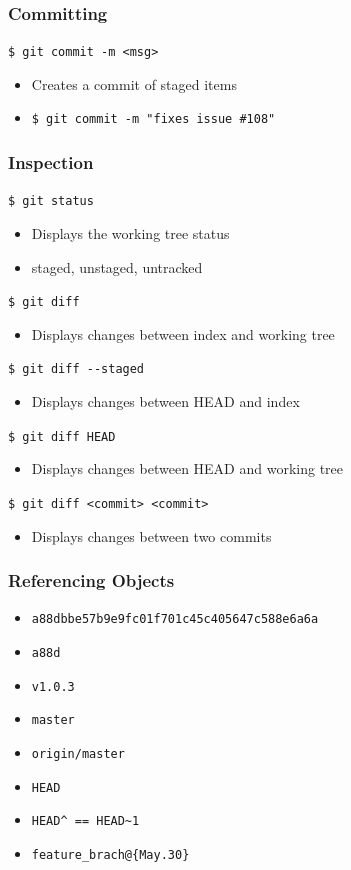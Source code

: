 \documentclass[english,compress]{beamer}
\begin{document}
\begin{frame}[fragile]
    \frametitle{Committing}

    \verb|$ git commit -m <msg>|
    \begin{itemize}
        \item Creates a commit of staged items
        \item \verb|$ git commit -m "fixes issue #108"|
    \end{itemize}
\end{frame}

\begin{frame}[fragile]
    \frametitle{Inspection}

    \verb|$ git status|
    \begin{itemize}
        \item Displays the working tree status
        \item staged, unstaged, untracked
    \end{itemize}
    \verb|$ git diff|
    \begin{itemize}
        \item Displays changes between index and working tree
    \end{itemize}
    \verb|$ git diff --staged|
    \begin{itemize}
        \item Displays changes between HEAD and index
    \end{itemize}
    \verb|$ git diff HEAD|
    \begin{itemize}
        \item Displays changes between HEAD and working tree
    \end{itemize}
    \verb|$ git diff <commit> <commit>|
    \begin{itemize}
        \item Displays changes between two commits
    \end{itemize}
\end{frame}

\begin{frame}[fragile]
    \frametitle{Referencing Objects}

    \begin{itemize}
        \item \verb|a88dbbe57b9e9fc01f701c45c405647c588e6a6a|
        \item \verb|a88d|
        \item \verb|v1.0.3|
        \item \verb|master|
        \item \verb|origin/master|
        \item \verb|HEAD|
        \item \verb|HEAD^ == HEAD~1|
        \item \verb|feature_brach@{May.30}|
    \end{itemize}
\end{frame}
\end{document}
